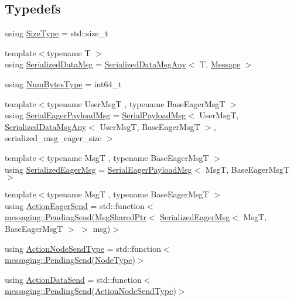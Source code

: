 \subsection*{Typedefs}
\begin{DoxyCompactItemize}
\item 
using \hyperlink{namespacevt_1_1serialization_ac7b555941c0bfd470bee3df22b967ff9}{Size\+Type} = std\+::size\+\_\+t
\item 
{\footnotesize template$<$typename T $>$ }\\using \hyperlink{namespacevt_1_1serialization_a56d2aee859dc963c2b5fad82649dd79a}{Serialized\+Data\+Msg} = \hyperlink{structvt_1_1serialization_1_1_serialized_data_msg_any}{Serialized\+Data\+Msg\+Any}$<$ T, \hyperlink{namespacevt_a3a3ddfef40b4c90915fa43cdd5f129ea}{Message} $>$
\item 
using \hyperlink{namespacevt_1_1serialization_aaa03b9b407ed5776043c163629312e40}{Num\+Bytes\+Type} = int64\+\_\+t
\item 
{\footnotesize template$<$typename User\+MsgT , typename Base\+Eager\+MsgT $>$ }\\using \hyperlink{namespacevt_1_1serialization_af3a0dfd4a0d3fa09c75edba0dc1b7fec}{Serial\+Eager\+Payload\+Msg} = \hyperlink{structvt_1_1serialization_1_1_serial_payload_msg}{Serial\+Payload\+Msg}$<$ User\+MsgT, \hyperlink{structvt_1_1serialization_1_1_serialized_data_msg_any}{Serialized\+Data\+Msg\+Any}$<$ User\+MsgT, Base\+Eager\+MsgT $>$, serialized\+\_\+msg\+\_\+eager\+\_\+size $>$
\item 
{\footnotesize template$<$typename MsgT , typename Base\+Eager\+MsgT $>$ }\\using \hyperlink{namespacevt_1_1serialization_ac8b37425f8316a800cdb0b0f0f8a6438}{Serialized\+Eager\+Msg} = \hyperlink{namespacevt_1_1serialization_af3a0dfd4a0d3fa09c75edba0dc1b7fec}{Serial\+Eager\+Payload\+Msg}$<$ MsgT, Base\+Eager\+MsgT $>$
\item 
{\footnotesize template$<$typename MsgT , typename Base\+Eager\+MsgT $>$ }\\using \hyperlink{namespacevt_1_1serialization_a009aa1de8d42a3c97643b947fcc6f0b6}{Action\+Eager\+Send} = std\+::function$<$ \hyperlink{structvt_1_1messaging_1_1_pending_send}{messaging\+::\+Pending\+Send}(\hyperlink{namespacevt_ab2b3d506ec8e8d1540aede826d84a239}{Msg\+Shared\+Ptr}$<$ \hyperlink{namespacevt_1_1serialization_ac8b37425f8316a800cdb0b0f0f8a6438}{Serialized\+Eager\+Msg}$<$ MsgT, Base\+Eager\+MsgT $>$ $>$ msg)$>$
\item 
using \hyperlink{namespacevt_1_1serialization_ad4f189ca4817d31b73436c92bca55deb}{Action\+Node\+Send\+Type} = std\+::function$<$ \hyperlink{structvt_1_1messaging_1_1_pending_send}{messaging\+::\+Pending\+Send}(\hyperlink{namespacevt_a866da9d0efc19c0a1ce79e9e492f47e2}{Node\+Type})$>$
\item 
using \hyperlink{namespacevt_1_1serialization_afffcac0da80b78e77ef8043dba4e814f}{Action\+Data\+Send} = std\+::function$<$ \hyperlink{structvt_1_1messaging_1_1_pending_send}{messaging\+::\+Pending\+Send}(\hyperlink{namespacevt_1_1serialization_ad4f189ca4817d31b73436c92bca55deb}{Action\+Node\+Send\+Type})$>$
\end{DoxyCompactItemize}


